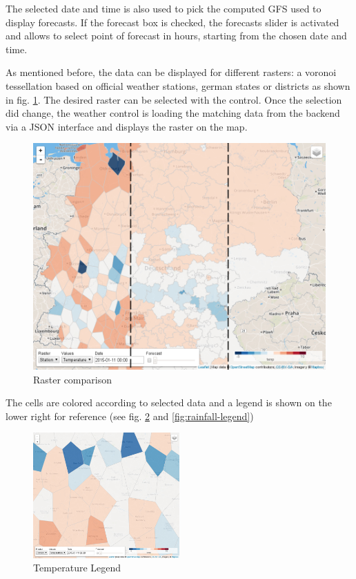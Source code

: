\documentclass[paper=a4, fontsize=11pt]{scrartcl} %
\numberwithin{equation}{section} %
\numberwithin{figure}{section} %
\numberwithin{table}{section} %
\begin{document}
The selected date and time is also used to pick the computed GFS used to
display forecasts. If the forecast box is checked, the forecasts slider
is activated and allows to select point of forecast in hours, starting
from the chosen date and time.

\newpage
As mentioned before, the data can be displayed for different rasters: a
voronoi tessellation based on official weather stations, german states or
districts as shown in fig. \ref{fig:raster-comparison}. The desired raster can be selected with the control. Once the
selection did change, the weather control is loading the matching data
from the backend via a JSON interface and displays the raster on the
map.

\begin{figure}[htbp]
\centering
\includegraphics[width=1\textwidth]{pictures/screenshot-raster.png}
\caption{Raster comparison}
\label{fig:raster-comparison}
\end{figure}

The cells are colored according to selected data and a legend is shown
on the lower right for reference (see fig. \ref{fig:temperature-legend} and \ref{fig:rainfall-legend})

\begin{figure}[htbp]
\centering
\includegraphics[width=0.5\textwidth]{pictures/screenshot-legend-temp.png}
\caption{Temperature Legend}
\label{fig:temperature-legend}
\end{figure}
\end{document}
